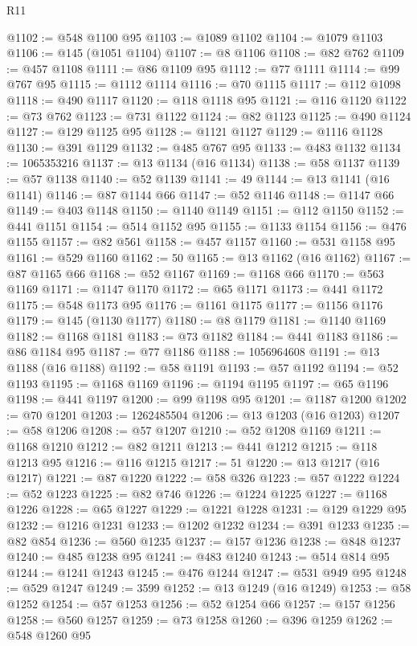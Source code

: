 \begin{lexlean}{R11}
\begin{coremodule}
@1102 := @548 @1100 @95
@1103 := @1089 @1102
@1104 := @1079 @1103
@1106 := @145 (@1051 @1104)
@1107 := @8 @1106
@1108 := @82 @762
@1109 := @457 @1108
@1111 := @86 @1109 @95
@1112 := @77 @1111
@1114 := @99 @767 @95
@1115 := @1112 @1114
@1116 := @70 @1115
@1117 := @112 @1098
@1118 := @490 @1117
@1120 := @118 @1118 @95
@1121 := @116 @1120
@1122 := @73 @762
@1123 := @731 @1122
@1124 := @82 @1123
@1125 := @490 @1124
@1127 := @129 @1125 @95
@1128 := @1121 @1127
@1129 := @1116 @1128
@1130 := @391 @1129
@1132 := @485 @767 @95
@1133 := @483 @1132
@1134 := 1065353216
@1137 := @13 @1134 (@16 @1134)
@1138 := @58 @1137
@1139 := @57 @1138
@1140 := @52 @1139
@1141 := 49
@1144 := @13 @1141 (@16 @1141)
@1146 := @87 @1144 @66
@1147 := @52 @1146
@1148 := @1147 @66
@1149 := @403 @1148
@1150 := @1140 @1149
@1151 := @112 @1150
@1152 := @441 @1151
@1154 := @514 @1152 @95
@1155 := @1133 @1154
@1156 := @476 @1155
@1157 := @82 @561
@1158 := @457 @1157
@1160 := @531 @1158 @95
@1161 := @529 @1160
@1162 := 50
@1165 := @13 @1162 (@16 @1162)
@1167 := @87 @1165 @66
@1168 := @52 @1167
@1169 := @1168 @66
@1170 := @563 @1169
@1171 := @1147 @1170
@1172 := @65 @1171
@1173 := @441 @1172
@1175 := @548 @1173 @95
@1176 := @1161 @1175
@1177 := @1156 @1176
@1179 := @145 (@1130 @1177)
@1180 := @8 @1179
@1181 := @1140 @1169
@1182 := @1168 @1181
@1183 := @73 @1182
@1184 := @441 @1183
@1186 := @86 @1184 @95
@1187 := @77 @1186
@1188 := 1056964608
@1191 := @13 @1188 (@16 @1188)
@1192 := @58 @1191
@1193 := @57 @1192
@1194 := @52 @1193
@1195 := @1168 @1169
@1196 := @1194 @1195
@1197 := @65 @1196
@1198 := @441 @1197
@1200 := @99 @1198 @95
@1201 := @1187 @1200
@1202 := @70 @1201
@1203 := 1262485504
@1206 := @13 @1203 (@16 @1203)
@1207 := @58 @1206
@1208 := @57 @1207
@1210 := @52 @1208 @1169
@1211 := @1168 @1210
@1212 := @82 @1211
@1213 := @441 @1212
@1215 := @118 @1213 @95
@1216 := @116 @1215
@1217 := 51
@1220 := @13 @1217 (@16 @1217)
@1221 := @87 @1220
@1222 := @58 @326
@1223 := @57 @1222
@1224 := @52 @1223
@1225 := @82 @746
@1226 := @1224 @1225
@1227 := @1168 @1226
@1228 := @65 @1227
@1229 := @1221 @1228
@1231 := @129 @1229 @95
@1232 := @1216 @1231
@1233 := @1202 @1232
@1234 := @391 @1233
@1235 := @82 @854
@1236 := @560 @1235
@1237 := @157 @1236
@1238 := @848 @1237
@1240 := @485 @1238 @95
@1241 := @483 @1240
@1243 := @514 @814 @95
@1244 := @1241 @1243
@1245 := @476 @1244
@1247 := @531 @949 @95
@1248 := @529 @1247
@1249 := 3599
@1252 := @13 @1249 (@16 @1249)
@1253 := @58 @1252
@1254 := @57 @1253
@1256 := @52 @1254 @66
@1257 := @157 @1256
@1258 := @560 @1257
@1259 := @73 @1258
@1260 := @396 @1259
@1262 := @548 @1260 @95

\end{coremodule}
\end{lexlean}

